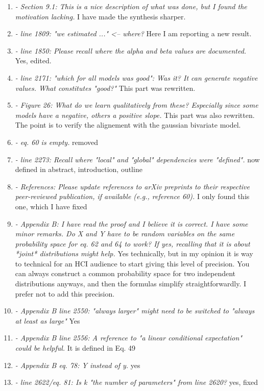 \documentclass{article}
\begin{document}
\begin{enumerate}
    \item \textit{- Section 9.1: This is a nice description of what was done, but I found the motivation lacking. } I have made the synthesis sharper.
    \item \textit{- line 1809: "we estimated ..." <-- where?} Here I am reporting a new result.
    \item \textit{- line 1850: Please recall where the alpha and beta values are documented. } Yes, edited.
    \item \textit{- line 2171: "which for all models was good": Was it? It can generate negative values. What constitutes "good?"} This part was rewritten.
    \item \textit{- Figure 26: What do we learn qualitatively from these? Especially since some models have a negative, others a positive slope.} This part was also rewritten. The point is to verify the alignement with the gaussian bivariate model.
    \item \textit{- eq. 60 is empty. } removed
    \item \textit{- line 2273: Recall where "local" and "global" dependencies were "defined". } now defined in abstract, introduction, outline
    \item \textit{- References: Please update references to arXiv preprints to their respective peer-reviewed publication, if available (e.g., reference 60). } I only found this one, which I have fixed
    \item \textit{- Appendix B: I have read the proof and I believe it is correct. I have some minor remarks. Do X and Y have to be random variables on the same probability space for eq. 62 and 64 to work? If yes, recalling that it is about *joint* distributions might help. } Yes technically, but in my opinion it is way to technical for an HCI audience to start giving this level of precision. You can always construct a common probability space for two independent distributions anyways, and then the formulas simplify straightforwardly. I prefer not to add this precision.
    \item \textit{- Appendix B line 2550: "always larger" might need to be switched to "always at least as large"} Yes
    \item \textit{- Appendix B line 2556: A reference to "a linear conditional expectation" could be helpful. } It is defined in Eq. 49
    \item \textit{- Appendix B eq. 78: Y instead of y. } yes
    \item \textit{- line 2622/eq. 81: Is k "the number of parameters" from line 2620?} yes, fixed
\end{enumerate}
\end{document}
